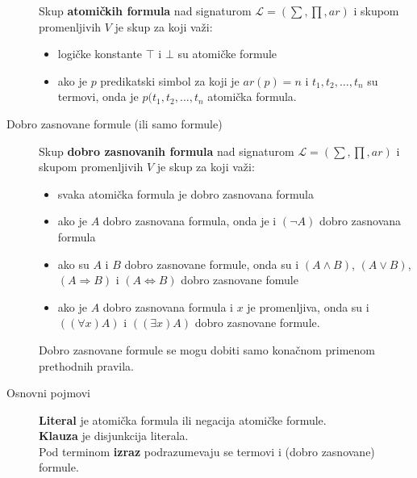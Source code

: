 \documentclass[../main.tex]{subfiles}
\begin{document}
\begin{description}
Skup {\bf atomičkih formula} nad signaturom $\mathcal{L} = (\sum, \prod, ar)$ i skupom promenljivih $V$ je skup za koji važi:
\begin{itemize}
	\item logičke konstante $\top$ i $\bot$ su atomičke formule 
	\item ako je $p$ predikatski simbol za koji je $ar(p)=n$ i $t_1,t_2, \ldots, t_n$ su termovi, onda je $p(t_1, t_2, \ldots, t_n$ atomička formula.
\end{itemize}

\item[Dobro zasnovane formule (ili samo formule)] \hfill

Skup {\bf dobro zasnovanih formula} nad signaturom $\mathcal{L} = (\sum, \prod, ar)$ i skupom promenljivih $V$ je skup za koji važi:
\begin{itemize}
	\item svaka atomička formula je dobro zasnovana formula
	\item ako je $A$ dobro zasnovana formula, onda je i $(\neg A)$ dobro zasnovana formula
	\item ako su $A$ i $B$ dobro zasnovane formule, onda su i $(A\wedge B)$, $(A\vee B)$, $(A\Rightarrow B)$ i $(A \Leftrightarrow B)$ dobro zasnovane fomule 	
	\item ako je $A$ dobro zasnovana formula i $x$ je promenljiva, onda su i $((\forall x)A)$ i $((\exists x)A)$ dobro zasnovane formule.
\end{itemize}
	Dobro zasnovane formule se mogu dobiti samo konačnom primenom prethodnih pravila.

\item[Osnovni pojmovi] \hfill

{\bf Literal} je atomička formula ili negacija atomičke formule.\\
{\bf Klauza} je disjunkcija literala. \\
Pod terminom {\bf izraz} podrazumevaju se termovi i (dobro zasnovane) formule. 
\end{description}
\end{document}

